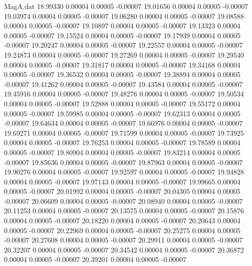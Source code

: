 \begin{filecontents}{MagA.dat}
  18.99330    0.00004    0.00005   -0.00007
  19.01656    0.00004    0.00005   -0.00007
  19.03974    0.00004    0.00005   -0.00007
  19.06280    0.00004    0.00005   -0.00007
  19.08588    0.00004    0.00005   -0.00007
  19.10897    0.00004    0.00005   -0.00007
  19.13323    0.00004    0.00005   -0.00007
  19.15524    0.00004    0.00005   -0.00007
  19.17939    0.00004    0.00005   -0.00007
  19.20247    0.00004    0.00005   -0.00007
  19.22557    0.00004    0.00005   -0.00007
  19.24873    0.00004    0.00005   -0.00007
  19.27269    0.00004    0.00005   -0.00007
  19.29540    0.00004    0.00005   -0.00007
  19.31817    0.00004    0.00005   -0.00007
  19.34168    0.00004    0.00005   -0.00007
  19.36532    0.00004    0.00005   -0.00007
  19.38894    0.00004    0.00005   -0.00007
  19.41262    0.00004    0.00005   -0.00007
  19.43584    0.00004    0.00005   -0.00007
  19.45916    0.00004    0.00005   -0.00007
  19.48276    0.00004    0.00005   -0.00007
  19.50534    0.00004    0.00005   -0.00007
  19.52888    0.00004    0.00005   -0.00007
  19.55172    0.00004    0.00005   -0.00007
  19.59985    0.00004    0.00005   -0.00007
  19.62313    0.00004    0.00005   -0.00007
  19.64634    0.00004    0.00005   -0.00007
  19.66976    0.00004    0.00005   -0.00007
  19.69271    0.00004    0.00005   -0.00007
  19.71599    0.00004    0.00005   -0.00007
  19.73925    0.00004    0.00005   -0.00007
  19.76253    0.00004    0.00005   -0.00007
  19.78589    0.00004    0.00005   -0.00007
  19.80904    0.00004    0.00005   -0.00007
  19.83214    0.00004    0.00005   -0.00007
  19.85636    0.00004    0.00005   -0.00007
  19.87963    0.00004    0.00005   -0.00007
  19.90276    0.00004    0.00005   -0.00007
  19.92597    0.00004    0.00005   -0.00007
  19.94828    0.00004    0.00005   -0.00007
  19.97143    0.00004    0.00005   -0.00007
  19.99665    0.00004    0.00005   -0.00007
  20.01992    0.00004    0.00005   -0.00007
  20.04305    0.00004    0.00005   -0.00007
  20.06609    0.00004    0.00005   -0.00007
  20.08940    0.00004    0.00005   -0.00007
  20.11253    0.00004    0.00005   -0.00007
  20.13575    0.00004    0.00005   -0.00007
  20.15876    0.00004    0.00005   -0.00007
  20.18220    0.00004    0.00005   -0.00007
  20.20643    0.00004    0.00005   -0.00007
  20.22969    0.00004    0.00005   -0.00007
  20.25275    0.00004    0.00005   -0.00007
  20.27608    0.00004    0.00005   -0.00007
  20.29911    0.00004    0.00005   -0.00007
  20.32207    0.00004    0.00005   -0.00007
  20.34542    0.00004    0.00005   -0.00007
  20.36872    0.00004    0.00005   -0.00007
  20.39201    0.00004    0.00005   -0.00007

\end{filecontents}
